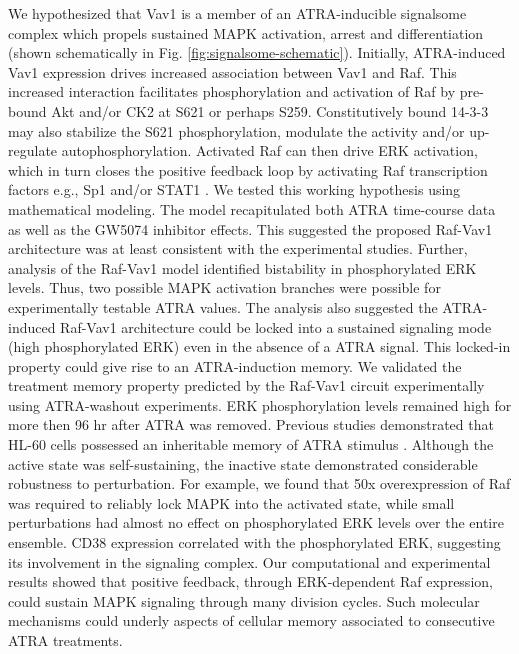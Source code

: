 \documentclass[12pt]{article}
\begin{document}
We hypothesized that Vav1 is a member of an ATRA-inducible signalsome complex which propels sustained MAPK activation, arrest and differentiation (shown schematically in Fig. \ref{fig:signalsome-schematic}).
Initially, ATRA-induced Vav1 expression drives increased association between Vav1 and Raf.
This increased interaction facilitates phosphorylation and activation of Raf by pre-bound Akt and/or CK2 at S621 or perhaps S259.
Constitutively bound 14-3-3 may also stabilize the S621 phosphorylation, modulate the activity and/or up-regulate autophosphorylation.
Activated Raf can then drive ERK activation, which in turn closes the positive feedback loop by activating Raf transcription factors
e.g., Sp1 and/or STAT1 \cite{Kim2009,Milanini-Mongiat2002,Zhang2004,Li2006}.
We tested this working hypothesis using mathematical modeling.
The model recapitulated both ATRA time-course data as well as the GW5074 inhibitor effects.
This suggested the proposed Raf-Vav1 architecture was at least consistent with the experimental studies.
Further, analysis of the Raf-Vav1 model identified bistability in phosphorylated ERK levels.
Thus, two possible MAPK activation branches were possible for experimentally testable ATRA values.
The analysis also suggested the ATRA-induced Raf-Vav1 architecture could be locked into a
sustained signaling mode (high phosphorylated ERK) even in the absence of a ATRA signal.
This locked-in property could give rise to an ATRA-induction memory.
We validated the treatment memory property predicted by the Raf-Vav1 circuit experimentally using ATRA-washout experiments.
ERK phosphorylation levels remained high for more then 96 hr after ATRA was removed.
Previous studies demonstrated that HL-60 cells possessed an inheritable memory of ATRA stimulus \cite{YEN1984}.
Although the active state was self-sustaining, the inactive state demonstrated considerable robustness to perturbation.
For example, we found that 50x overexpression of Raf was required to reliably lock MAPK into the activated state, while small perturbations had almost no effect on phosphorylated ERK levels over the entire ensemble.
CD38 expression correlated with the phosphorylated ERK, suggesting its involvement in the signaling complex.
Our computational and experimental results showed that positive feedback,
through ERK-dependent Raf expression, could sustain MAPK signaling through many division cycles.
Such molecular mechanisms could underly aspects of cellular memory associated to consecutive ATRA treatments.
\end{document}
